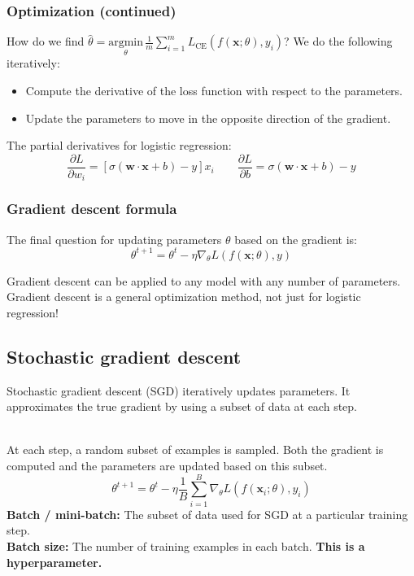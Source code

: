 \documentclass[11pt]{article}
\begin{document}
\subsubsection{Optimization (continued)}
How do we find $\hat{\theta}=\underset{\theta}{\text{argmin}}\hspace{2pt}\frac{1}{m}\sum_{i=1}^{m}L_{\text{CE}}(f(\mathbf{x};\theta), y_i)$? We do the following iteratively:
\begin{itemize}
    \item Compute the derivative of the loss function with respect to the parameters.
    \item Update the parameters to move in the opposite direction of the gradient.
\end{itemize}
The partial derivatives for logistic regression:
$$
\boxed{\frac{\partial L}{\partial w_i}=[\sigma(\mathbf{w}\cdot\mathbf{x}+b)-y]x_i}\quad\quad\boxed{\frac{\partial L}{\partial b}=\sigma(\mathbf{w}\cdot\mathbf{x}+b)-y}
$$

\subsubsection{Gradient descent formula}
The final question for updating parameters $\theta$ based on the gradient is:
$$
\theta^{t+1}=\theta^t-\eta\nabla_{\theta}L(f(\mathbf{x};\theta),y)
$$
\begin{note}[Note]
Gradient descent can be applied to any model with any number of parameters. Gradient descent is a general optimization method, not just for logistic regression!
\end{note}

\subsection{Stochastic gradient descent}
\begin{definition}
Stochastic gradient descent (SGD) iteratively updates parameters. It approximates the true gradient by using a subset of data at each step.
\end{definition}
$\quad$\\[-1em]
At each step, a random subset of examples is sampled. Both the gradient is computed and the parameters are updated based on this subset.
$$
\theta^{t+1}=\theta^{t}-\eta\frac{1}{B}\sum_{i=1}^{B}\nabla_{\theta}L(f(\mathbf{x}_i;\theta), y_i)
$$
\textbf{Batch / mini-batch:} The subset of data used for SGD at a particular training step. \\
\textbf{Batch size:} The number of training examples in each batch. \textbf{This is a hyperparameter.}
\end{document}
